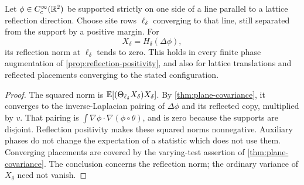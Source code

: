 \begin{corollary}
\label{cor:reflection-null}
Let \(\phi\in C_c^\infty(\mathbb R^2)\) be supported strictly on one side of a line
parallel to a lattice reflection direction. Choose site rows \(\ell_\delta\)
converging to that line, still separated from the support by a positive
margin. For
\begin{equation}
 \label{eq:laplace-insertion}
 X_\delta=H_\delta(\Delta\phi),
\end{equation}
its reflection norm at \(\ell_\delta\) tends to zero. This holds in every
finite phase augmentation of \cref{prop:reflection-positivity}, and also for
lattice translations and reflected placements converging to the stated
configuration.
\end{corollary}

\begin{proof}
The squared norm is
\(\mathbb E[(\Theta_{\ell_\delta}X_\delta)X_\delta]\). By
\cref{thm:plane-covariance}, it converges to the inverse-Laplacian pairing of
\(\Delta\phi\) and its reflected copy, multiplied by \(v\). That pairing is
\(\int\nabla\phi\cdot\nabla(\phi\circ\theta)\), and is zero because the
supports are disjoint. Reflection positivity makes these squared norms
nonnegative. Auxiliary phases do not change the expectation of a statistic
which does not use them. Converging placements are covered by the varying-test
assertion of \cref{thm:plane-covariance}. The conclusion concerns the reflection
norm; the ordinary variance of \(X_\delta\) need not vanish.
\end{proof}
